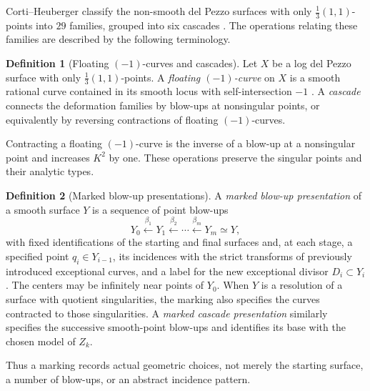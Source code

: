 \documentclass[11pt]{article}
\theoremstyle{plain}
\theoremstyle{definition}
\newtheorem{definition}[definition]{Definition}
\theoremstyle{remark}
\begin{document}
Corti--Heuberger classify the non-smooth del Pezzo surfaces with only
\(\frac13(1,1)\)-points into \(29\) families, grouped into six cascades
\cite[Theorems~3--4]{Corti2016}. The operations relating these families
are described by the following terminology.

\begin{definition}[Floating \((-1)\)-curves and cascades]
\label{def:floating-curves-cascades}
Let \(X\) be a log del Pezzo surface with only \(\frac13(1,1)\)-points.
A \emph{floating \((-1)\)-curve} on \(X\) is a smooth rational curve
contained in its smooth locus with self-intersection \(-1\)
\cite[Definition~5]{Corti2016}. A \emph{cascade} connects the deformation
families by blow-ups at nonsingular points, or equivalently by reversing
contractions of floating \((-1)\)-curves.
\end{definition}

Contracting a floating \((-1)\)-curve is the inverse of a blow-up at a
nonsingular point and increases \(K^2\) by one. These operations preserve
the singular points and their analytic types.

\begin{definition}[Marked blow-up presentations]
\label{def:marked-blowup-presentation}
A \emph{marked blow-up presentation} of a smooth surface \(Y\) is a
sequence of point blow-ups
\[
Y_0\xleftarrow{\beta_1}Y_1\xleftarrow{\beta_2}\cdots
\xleftarrow{\beta_m}Y_m\simeq Y,
\]
with fixed identifications of the starting and final surfaces and, at
each stage, a specified point \(q_i\in Y_{i-1}\), its incidences with
the strict transforms of previously introduced exceptional curves, and
a label for the new exceptional divisor \(D_i\subset Y_i\).
The centers may be infinitely near points of \(Y_0\). When \(Y\) is a
resolution of a surface with quotient singularities, the marking also
specifies the curves contracted to those singularities. A \emph{marked
cascade presentation} similarly specifies the successive smooth-point
blow-ups and identifies its base with the chosen model of \(Z_k\).
\end{definition}

Thus a marking records actual geometric choices, not merely the starting
surface, a number of blow-ups, or an abstract incidence pattern.
\end{document}
